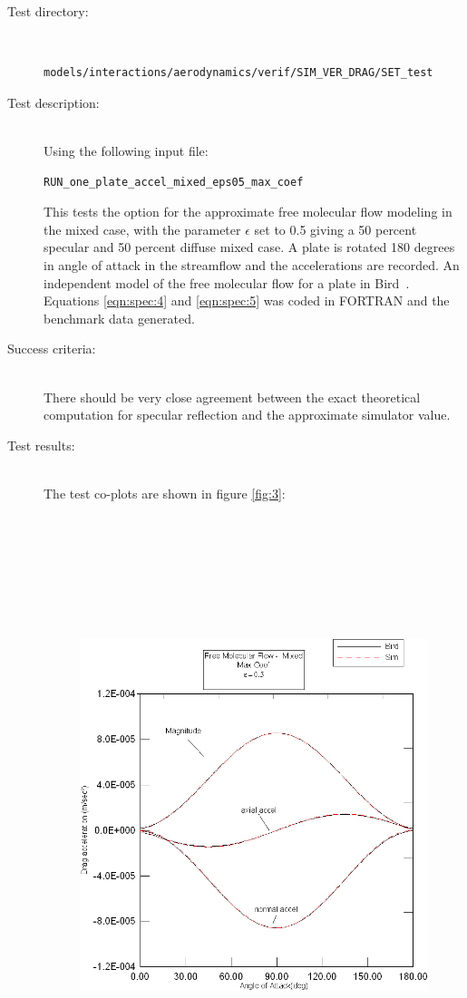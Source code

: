 \label{test:amfm}
\begin{description}
\item[Test directory:] \
\begin{verbatim}models/interactions/aerodynamics/verif/SIM_VER_DRAG/SET_test\end{verbatim}
\item[Test description:] \ \\
Using the following input file:
\begin{verbatim}RUN_one_plate_accel_mixed_eps05_max_coef\end{verbatim}
This tests the option for the approximate free
molecular flow modeling in the mixed case,
with the parameter
$\epsilon$ set to 0.5 giving a 50 percent specular and  50 percent
diffuse mixed case.  A plate is rotated 180 degrees in angle of
attack in the streamflow and the accelerations are recorded.  An
independent model of the free molecular flow for a plate in Bird~\cite{Bird}.
Equations \ref{eqn:spec:4} and \ref{eqn:spec:5} was coded in FORTRAN and the
benchmark data generated.
\item[Success criteria:] \ \\
There should be very close agreement between the exact theoretical
computation for specular reflection and the approximate simulator
value.
\item[Test results:] \ \\
The test co-plots are shown in figure \ref{fig:3}:
\begin{figure}[hbpt]
\includegraphics [height=175mm]{figs/mixed_max.jpg}

\end{figure}
\end{description}

